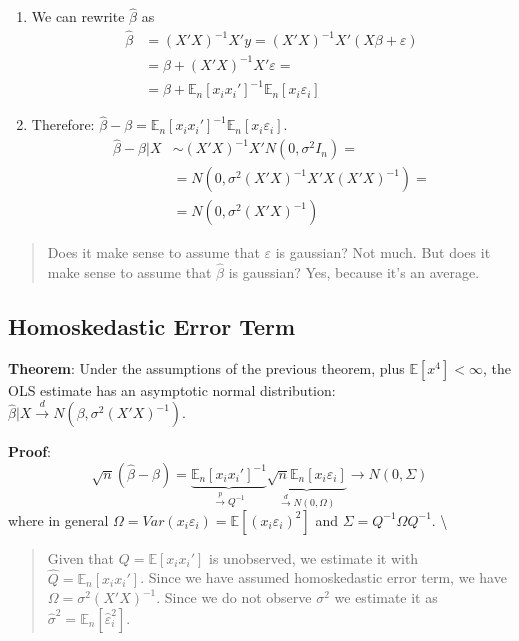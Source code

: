 \documentclass[12pt,]{book}
\providecommand{\tightlist}{%
  \setlength{\itemsep}{0pt}\setlength{\parskip}{0pt}}
\begin{document}
\begin{enumerate}
\def\labelenumi{\arabic{enumi}.}
\tightlist
\item
  We can rewrite \(\hat \beta\) as
  \[
   \begin{aligned}
       \hat \beta & = (X'X)^{-1} X'y = (X'X)^{-1} X'(X\beta + \varepsilon) \\
       &= \beta + (X'X)^{-1} X' \varepsilon = \\
       &= \beta + \mathbb E_n [x_i x_i']^{-1} \mathbb E_n [x_i \varepsilon_i]
   \end{aligned}
   \]
\item
  Therefore: \(\hat \beta-\beta = \mathbb E_n [x_i x_i']^{-1} \mathbb E_n [x_i \varepsilon_i]\).
  \[
   \begin{aligned}
       \hat \beta-\beta |X & \sim (X'X)^{-1} X' N(0, \sigma^2 I_n) = \\
       &= N(0, \sigma^2 (X'X)^{-1} X'X (X'X)^{-1}) = \\
       &= N(0, \sigma^2 (X'X)^{-1})
   \end{aligned}
   \]
  \[\tag*{$\blacksquare$}\]
\end{enumerate}

\begin{quote}
Does it make sense to assume that \(\varepsilon\) is gaussian? Not much. But does it make sense to assume that \(\hat \beta\) is gaussian? Yes, because it's an average.
\end{quote}

\hypertarget{homoskedastic-error-term}{%
\subsection{Homoskedastic Error Term}\label{homoskedastic-error-term}}

\textbf{Theorem}:
Under the assumptions of the previous theorem, plus \(\mathbb E[x^4] < \infty\), the OLS estimate has an asymptotic normal distribution: \(\hat \beta|X \overset{d}{\to} N(\beta, \sigma^2 (X'X)^{-1})\).

\textbf{Proof}:
\[
    \sqrt{n} (\hat \beta - \beta ) = \underbrace{\mathbb E_n [x_i x_i']^{-1}} _ {\xrightarrow{p} Q^{-1} }   \underbrace{\sqrt{n} \mathbb E_n [x_i \varepsilon_i ]} _ {\xrightarrow{d} N(0, \Omega)} \rightarrow N(0, \Sigma )
    \]
where in general \(\Omega = Var (x_i \varepsilon_i) = \mathbb E [(x_i \varepsilon_i)^2]\) and \(\Sigma = Q^{-1} \Omega Q^{-1}\). \textbackslash{}
\[\tag*{$\blacksquare$}\]

\begin{quote}
Given that \(Q = \mathbb E [x_i x_i']\) is unobserved, we estimate it with \(\hat{Q} = \mathbb E_n [x_i x_i']\). Since we have assumed homoskedastic error term, we have \(\Omega = \sigma^2 (X'X)^{-1}\). Since we do not observe \(\sigma^2\) we estimate it as \(\hat{\sigma}^2 = \mathbb E_n[\hat{\varepsilon}_i^2]\).
\end{quote}
\end{document}
